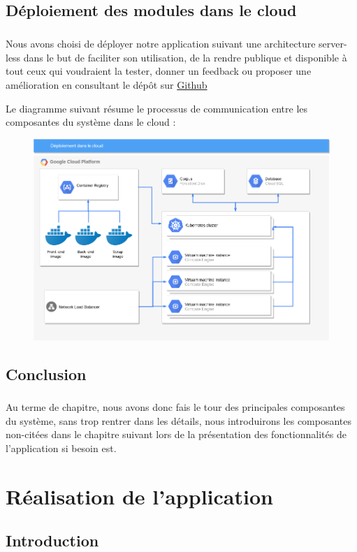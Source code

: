 \documentclass[]{report}
\begin{document}
	\section{Déploiement des modules dans le cloud}
		\paragraph{}
		Nous avons choisi de déployer notre application suivant une architecture server-less dans le but de faciliter son utilisation, de la rendre publique et disponible à tout ceux qui voudraient la tester, donner un feedback ou proposer une amélioration en consultant le dépôt sur \href{https://github.com/mohammedi-haroune/arabic-historical-dictionary-frontend}{Github}
		\par 
		Le diagramme suivant résume le processus de communication entre les composantes du système dans le cloud : 
		\begin{figure}[H]
			\centering
			\includegraphics[width=0.75\linewidth]{images/cloud_schema.png}
		\end{figure}
	\section{Conclusion}
		\paragraph{}
		Au terme de chapitre, nous avons donc fais le tour des principales composantes du système, sans trop rentrer dans les détails, nous introduirons les composantes non-citées dans le chapitre suivant lors de la présentation des fonctionnalités de l'application si besoin est.  
\chapter{Réalisation de l'application}
	\section{Introduction}
\end{document}
